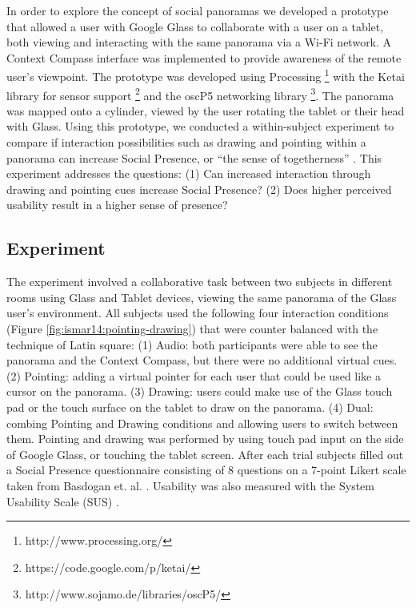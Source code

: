 In order to explore the concept of social panoramas we developed a prototype that allowed a user with Google Glass to collaborate with a user on a tablet, both viewing and interacting with the same panorama via a Wi-Fi network. A Context Compass interface \cite{Suomela2000} was implemented to provide awareness of the remote user's viewpoint. The prototype was developed using Processing \footnote{http://www.processing.org/} with the Ketai library for sensor support \footnote{https://code.google.com/p/ketai/} and the oscP5 networking library \footnote{http://www.sojamo.de/libraries/oscP5/}. The panorama was mapped onto a cylinder, viewed by the user rotating the tablet or their head with Glass. Using this prototype, we conducted a within-subject experiment to compare if interaction possibilities such as drawing and pointing within a panorama can increase Social Presence, or “the sense of togetherness” \cite{Basdogan2001}. This experiment addresses the questions: (1) Can increased interaction through drawing and pointing cues increase Social Presence? (2) Does higher perceived usability result in a higher sense of presence?


\subsection{Experiment}

The experiment involved a collaborative task between two subjects in different rooms using Glass and Tablet devices, viewing the same panorama of the Glass user's environment. All subjects used the following four interaction conditions (Figure \ref{fig:ismar14:pointing-drawing}) that were counter balanced with the technique of Latin square: 
(1) Audio: both participants were able to see the panorama and the Context Compass, but there were no additional virtual cues. 
(2) Pointing: adding a virtual pointer for each user that could be used like a cursor on the panorama.
(3) Drawing: users could make use of the Glass touch pad or the touch surface on the tablet to draw on the panorama. 
(4) Dual: combing Pointing and Drawing conditions and allowing users to switch between them.
Pointing and drawing was performed by using touch pad input on the side of Google Glass, or touching the tablet screen. After each trial subjects filled out a Social Presence questionnaire consisting of 8 questions on a 7-point Likert scale taken from Basdogan et. al. \cite{Basdogan2001}. Usability was also measured with the System Usability Scale (SUS) \cite{brooke1996sus}.

